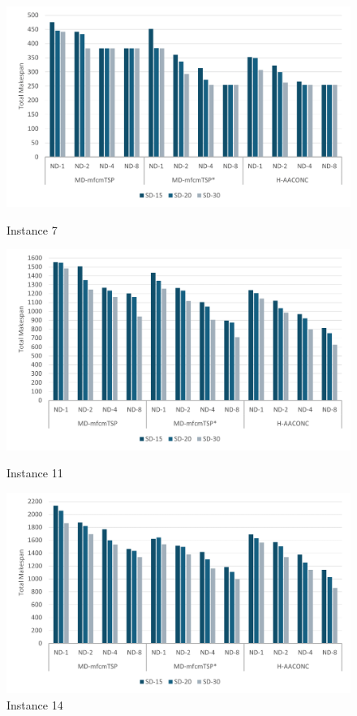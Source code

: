 \documentclass{article}
\begin{document}
	\begin{figure}[h]
		\centering
		\begin{minipage}{0.33\textwidth}
			\centering
			\includegraphics[scale=0.42]{p07_drones}\;
			\caption{Instance 7}
			\label{fig:p07_drones}
		\end{minipage}
		\begin{minipage}{0.33\textwidth}
			\centering
			\includegraphics[scale=0.42]{p11_drones}\;
			\caption{Instance 11}
			\label{fig:p11_drones}
		\end{minipage}
		\begin{minipage}{0.33\textwidth}
			\centering
			\includegraphics[scale=0.42]{p33_drones}\;
			\caption{Instance 14}
			\label{fig:p33_drones}
		\end{minipage}
	\end{figure}
	
	\;
	\;
	\;
	
	\clearpage
	\printbibliography
	
\end{document}
